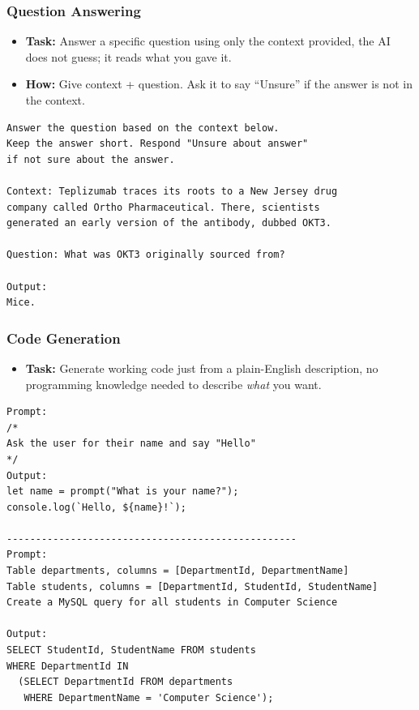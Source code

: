 \begin{frame}[fragile]\frametitle{Question Answering}
\begin{itemize}
    \item \textbf{Task:} Answer a specific question using only the context provided, the AI does not guess; it reads what you gave it.
    \item \textbf{How:} Give context + question. Ask it to say ``Unsure'' if the answer is not in the context.
\end{itemize}
\begin{lstlisting}[language=HTML]
Answer the question based on the context below. 
Keep the answer short. Respond "Unsure about answer" 
if not sure about the answer.

Context: Teplizumab traces its roots to a New Jersey drug 
company called Ortho Pharmaceutical. There, scientists 
generated an early version of the antibody, dubbed OKT3.

Question: What was OKT3 originally sourced from?

Output:
Mice.
\end{lstlisting}
\end{frame}

\begin{frame}[fragile]\frametitle{Code Generation}
\begin{itemize}
    \item \textbf{Task:} Generate working code just from a plain-English description, no programming knowledge needed to describe \emph{what} you want.
\end{itemize}
\begin{lstlisting}[language=HTML]
Prompt:
/*
Ask the user for their name and say "Hello"
*/
Output:
let name = prompt("What is your name?");
console.log(`Hello, ${name}!`);

--------------------------------------------------
Prompt:
Table departments, columns = [DepartmentId, DepartmentName]
Table students, columns = [DepartmentId, StudentId, StudentName]
Create a MySQL query for all students in Computer Science

Output:
SELECT StudentId, StudentName FROM students 
WHERE DepartmentId IN 
  (SELECT DepartmentId FROM departments 
   WHERE DepartmentName = 'Computer Science');
\end{lstlisting}
\end{frame}

